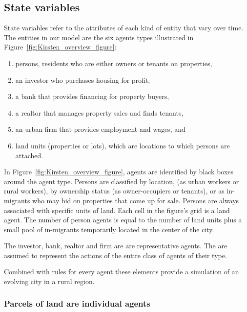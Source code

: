 \subsection{State variables}
State variables refer to the attributes of each kind of entity that vary over time. %
The entities in our model are the six agents types illustrated in Figure~\ref{fig:Kirsten_overview_figure}: 
\begin{enumerate}
    \item persons, residents who are either owners or tenants on properties,
    \item an investor who purchases housing for profit,
    \item  a bank that provides financing for property buyers,
    \item a realtor that manages property sales and finds tenants, 
    \item an urban firm that provides employment and wages, and 
    \item land units (properties or lots), which are locations to which persons are attached. 
\end{enumerate}

In Figure~\ref{fig:Kirsten_overview_figure}, agents are identified by black boxes around the agent type. Persons are classified by location, (as urban workers or rural workers), by ownership status (as owner-occupiers or tenants), or as in-migrants who may bid on properties that come up for sale. %
Persons are always associated with specific units of land. Each cell in the figure's grid is a land agent.  The number of person agents is equal to the number of land units plus a small pool of in-migrants temporarily located in the center of the city.

The investor, bank, realtor and firm are are \glspl{representative agent}. The are assumed to represent the actions of the entire class of agents of their type. 
 
Combined with rules for every agent these elements provide a simulation of an evolving city in a rural region. 

\subsubsection{Parcels of land are individual agents}

